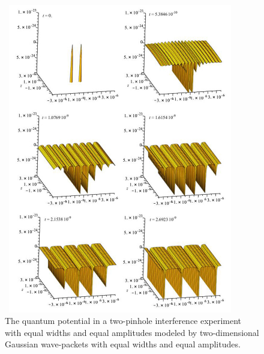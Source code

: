 \documentclass[12pt]{article}       %
\begin{document}
\begin{figure}[h]
\unitlength=1in
\hspace*{1.1in}\includegraphics[width=4in,height=5.33in]  {figure8.jpg}  
\caption{The quantum potential in a two-pinhole interference experiment with  equal widths and equal amplitudes modeled by two-dimensional Gaussian wave-packets with equal widths and equal amplitudes.\label{QPAnim}}
\end{figure}
\end{document}
